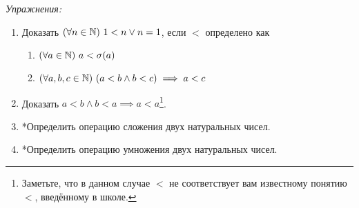 {\it Упражнения:}
\begin{enumerate}
	\item{}Доказать $(\forall n\in\mathbb{N})~1<n\lor n=1$, если $<$ определено как
	\begin{enumerate}
		\item{}$(\forall a\in\mathbb{N})~a<\sigma(a)$
		\item{}$(\forall a,b,c\in\mathbb{N})~(a<b\land b<c)\implies a<c$
	\end{enumerate}
	\item{}Доказать $a<b\land b<a\implies a<a$\footnote{
		Заметьте, что в данном случае $<$ не соответствует вам известному понятию $<$,
		введённому в школе.
	}.
	\item{}*Определить операцию сложения двух натуральных чисел.
	\item{}*Определить операцию умножения двух натуральных чисел.
\end{enumerate}
